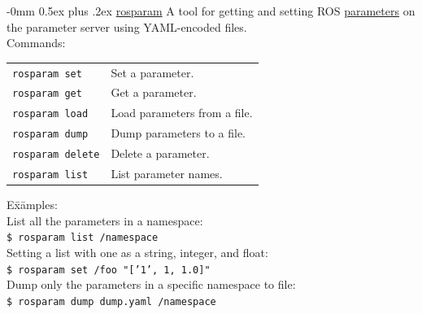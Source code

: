 \documentclass[10pt,landscape]{article}
\makeatletter
\renewcommand{\subsection}{\@startsection{subsection}{2}{0mm}%
                                {-0mm}%
                                {0.5ex plus .2ex}%
                                {\normalfont\normalsize\bfseries}}
\newenvironment{nstabbing}
  {\setlength{\topsep}{1pt}%
   \setlength{\partopsep}{1pt}%
   \tabbing}
  {\endtabbing}
\makeatother
\begin{document}
\begin{multicols}{3}
\subsection{\href{http://wiki.ros.org/rosparam}{rosparam}}
A tool for getting and setting ROS \href{http://wiki.ros.org/Parameter Server}{parameters} on the parameter server using YAML-encoded files.\\
Commands: \\
\begin{tabular}{p{\the\MyLen}%
                @{}p{\linewidth-\the\MyLen}@{}}
\texttt{rosparam set}    & Set a parameter. \\
\texttt{rosparam get}    & Get a parameter. \\
\texttt{rosparam load}   & Load parameters from a file. \\
\texttt{rosparam dump}   & Dump parameters to a file. \\
\texttt{rosparam delete} & Delete a parameter. \\
\texttt{rosparam list}   & List parameter names.
\end{tabular}
\begin{nstabbing}
E\=x\=amples:\\
\> List all the parameters in a namespace:\\
\> \>\texttt{\$ rosparam list /namespace}\\
\> Setting a list with one as a string, integer, and float:\\
\> \>\texttt{\$ rosparam set /foo "['1', 1, 1.0]"}\\
\> Dump only the parameters in a specific namespace to file:\\
\> \>\texttt{\$ rosparam dump dump.yaml /namespace}
\end{nstabbing}


\end{multicols}
\end{document}
